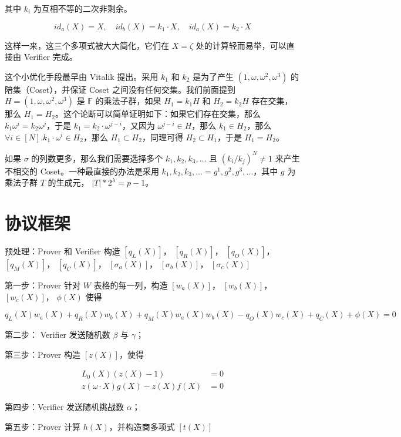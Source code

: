其中 \(k_i\) 为互相不等的二次非剩余。

\[
{id_a}(X) = X, \quad {id_b}(X) = k_1\cdot X, \quad  {id_a}(X) = k_2\cdot X
\]

这样一来，这三个多项式被大大简化，它们在 \(X=\zeta\)
处的计算轻而易举，可以直接由 Verifier 完成。

这个小优化手段最早由 Vitalik 提出。采用 \(k_1\) 和 \(k_2\) 是为了产生
\((1,\omega,\omega^2,\omega^3)\) 的陪集（Coset），并保证 Coset
之间没有任何交集。我们前面提到 \(H=(1,\omega,\omega^2,\omega^3)\) 是
\(\mathbb{F}\) 的乘法子群，如果 \(H_1=k_1H\) 和 \(H_2=k_2H\)
存在交集，那么
\(H_1=H_2\)。这个论断可以简单证明如下：如果它们存在交集，那么
\(k_1\omega^i=k_2\omega^j\)，于是 \(k_1=k_2\cdot\omega^{j-i}\)，又因为
\(\omega^{j-i}\in H\)，那么 \(k_1\in H_2\)，那么
\(\forall i\in[N]. k_1\cdot \omega^i\in H_2\)，那么
\(H_1\subset H_2\)，同理可得 \(H_2\subset H_1\)，于是 \(H_1=H_2\)。

如果 \(\sigma\) 的列数更多，那么我们需要选择多个 \(k_1, k_2,k_3,\ldots\)
且 \((k_i/k_j)^N\neq1\) 来产生不相交的 Coset。一种最直接的办法是采用
\(k_1,k_2,k_3,\ldots=g^1,g^2,g^3,\ldots\)，其中 \(g\) 为乘法子群 \(T\)
的生成元， \(|T|*2^\lambda=p-1\)。

\hypertarget{ux534fux8baeux6846ux67b6}{%
\section{协议框架}\label{ux534fux8baeux6846ux67b6}}

预处理：Prover 和 Verifier 构造 \([q_L(X)]\)， \([q_R(X)]\)，
\([q_O(X)]\)， \([q_M(X)]\)， \([q_C(X)]\)， \([{\sigma_a}(X)]\)，
\([{\sigma_b}(X)]\)， \([{\sigma_c}(X)]\)

第一步：Prover 针对 \(W\) 表格的每一列，构造 \([w_a(X)]\)，
\([w_b(X)]\)， \([w_c(X)]\)， \(\phi(X)\) 使得

\[
q_L(X)w_a(X)+q_R(X)w_b(X)+ q_M(X)w_a(X)w_b(X) - q_O(X)w_c(X)+q_C(X) + \phi(X) = 0
\]

第二步： Verifier 发送随机数 \(\beta\) 与 \(\gamma\)；

第三步：Prover 构造 \([z(X)]\)，使得

\[
\begin{split}
L_0(X)(z(X)-1) &= 0 \\
z(\omega\cdot X)g(X) -  z(X)f(X) &=0
\end{split}
\]

第四步：Verifier 发送随机挑战数 \(\alpha\)；

第五步：Prover 计算 \(h(X)\)，并构造商多项式 \([t(X)]\)

